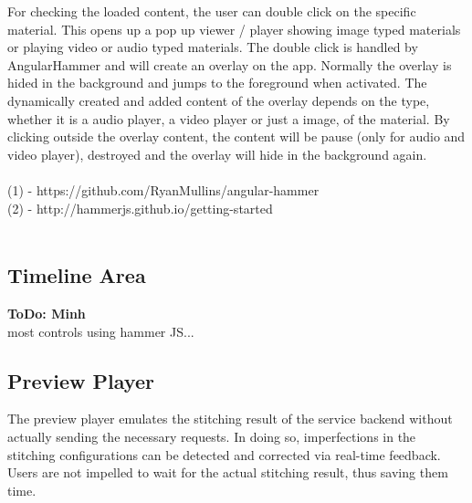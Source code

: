 \documentclass[conference]{IEEEtran}
\begin{document}
For checking the loaded content, the user can double click on the specific material. This opens up a pop up viewer / player showing image typed materials or playing video or audio typed materials. The double click is handled by AngularHammer and will create an overlay on the app. Normally the overlay is hided in the background and jumps to the foreground when activated. The dynamically created and added content of the overlay depends on the type, whether it is a audio player, a video player or just a image, of the material. By clicking outside the overlay content, the content will be pause (only for audio and video player), destroyed and the overlay will hide in the background again.\\
\\
(1) - https://github.com/RyanMullins/angular-hammer\\
(2) - http://hammerjs.github.io/getting-started\\
\\

\subsection{Timeline Area}
\textbf{ToDo: Minh} \\
most controls using hammer JS...

\newpage

\subsection{Preview Player}
The preview player emulates the stitching result of the service backend without actually sending the necessary requests.
In doing so, imperfections in the stitching configurations can be detected and corrected via real-time feedback.
Users are not impelled to wait for the actual stitching result, thus saving them time.
\\
\end{document}
